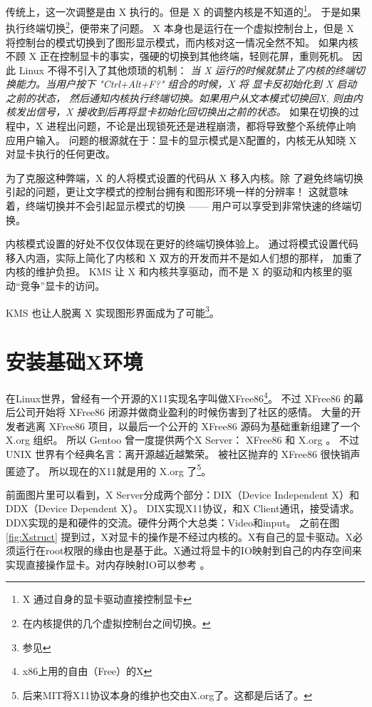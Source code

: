 传统上，这一次调整是由 X 执行的。但是 X 的调整内核是不知道的\footnote{X 通过自身的显卡驱动直接控制显卡}。
于是如果执行终端切换\footnote{在内核提供的几个虚拟控制台之间切换。}，便带来了问题。
X 本身也是运行在一个虚拟控制台上，但是 X 将控制台的模式切换到了图形显示模式，而内核对这一情况全然不知。
如果内核不顾 X 正在控制显卡的事实，强硬的切换到其他终端，轻则花屏，重则死机。
因此 Linux 不得不引入了其他烦琐的机制： 
\textit{
当 X 运行的时候就禁止了内核的终端切换能力。当用户按下 "Ctrl+Alt+F?" 组合的时候，X 将 显卡反初始化到 X 启动之前的状态， 然后通知内核执行终端切换。如果用户从文本模式切换回X, 则由内核发出信号，X 接收到后再将显卡初始化回切换出之前的状态。
}
如果在切换的过程中，X 进程出问题，不论是出现锁死还是进程崩溃，都将导致整个系统停止响应用户输入。
问题的根源就在于：显卡的显示模式是X配置的，内核无从知晓 X 对显卡执行的任何更改。

为了克服这种弊端，X 的人将模式设置的代码从 X 移入内核。除
了避免终端切换引起的问题，更让文字模式的控制台拥有和图形环境一样的分辨率！
这就意味着，终端切换并不会引起显示模式的切换 —— 用户可以享受到非常快速的终端切换。

内核模式设置的好处不仅仅体现在更好的终端切换体验上。
通过将模式设置代码移入内涵，实际上简化了内核和 X 双方的开发而并不是如人们想的那样， 加重了内核的维护负担。
KMS 让 X 和内核共享驱动，而不是 X 的驱动和内核里的驱动“竞争”显卡的访问。

KMS 也让人脱离 X 实现图形界面成为了可能\footnote{参见  }。

\section{安装基础X环境}


在Linux世界，曾经有一个开源的X11实现名字叫做XFree86\footnote{x86上用的自由（Free）的X}。
不过 XFree86 的幕后公司开始将 XFree86 闭源并做商业盈利的时候伤害到了社区的感情。
大量的开发者逃离 XFree86 项目，以最后一个公开的 XFree86 源码为基础重新组建了一个 X.org 组织。
所以 Gentoo 曾一度提供两个X Server： XFree86 和 X.org 。
不过 UNIX 世界有个经典名言：离开源越近越繁荣。
被社区抛弃的 XFree86 很快销声匿迹了。
所以现在的X11就是用的 X.org 了\footnote{后来MIT将X11协议本身的维护也交由X.org了。这都是后话了。}。


前面图片里可以看到，X Server分成两个部分：DIX（Device Independent X）和DDX（Device Dependent X）。 DIX实现X11协议，和X Client通讯，接受请求。
DDX实现的是和硬件的交流。硬件分两个大总类：Video和input。
之前在图 \ref{fig:Xstruct} 提到过，X对显卡的操作是不经过内核的。X有自己的显卡驱动。X必须运行在root权限的缘由也是基于此。X通过将显卡的IO映射到自己的内存空间来实现直接操作显卡。对内存映射IO可以参考 。

